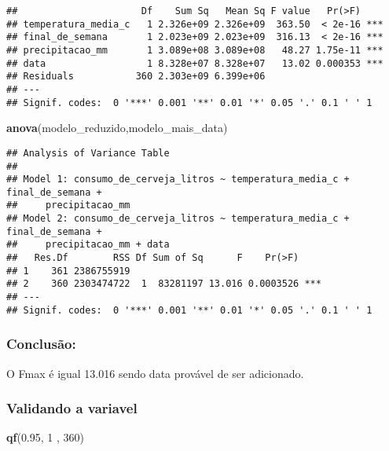 \documentclass[
]{article}
\newenvironment{Shaded}{\begin{snugshade}}{\end{snugshade}}
\newcommand{\DecValTok}[1]{\textcolor[rgb]{0.00,0.00,0.81}{#1}}
\newcommand{\FloatTok}[1]{\textcolor[rgb]{0.00,0.00,0.81}{#1}}
\newcommand{\FunctionTok}[1]{\textcolor[rgb]{0.13,0.29,0.53}{\textbf{#1}}}
\newcommand{\NormalTok}[1]{#1}
\begin{document}
\begin{verbatim}
##                      Df    Sum Sq   Mean Sq F value   Pr(>F)    
## temperatura_media_c   1 2.326e+09 2.326e+09  363.50  < 2e-16 ***
## final_de_semana       1 2.023e+09 2.023e+09  316.13  < 2e-16 ***
## precipitacao_mm       1 3.089e+08 3.089e+08   48.27 1.75e-11 ***
## data                  1 8.328e+07 8.328e+07   13.02 0.000353 ***
## Residuals           360 2.303e+09 6.399e+06                     
## ---
## Signif. codes:  0 '***' 0.001 '**' 0.01 '*' 0.05 '.' 0.1 ' ' 1
\end{verbatim}

\begin{Shaded}
\begin{Highlighting}[]
\FunctionTok{anova}\NormalTok{(modelo\_reduzido,modelo\_mais\_data)}
\end{Highlighting}
\end{Shaded}

\begin{verbatim}
## Analysis of Variance Table
## 
## Model 1: consumo_de_cerveja_litros ~ temperatura_media_c + final_de_semana + 
##     precipitacao_mm
## Model 2: consumo_de_cerveja_litros ~ temperatura_media_c + final_de_semana + 
##     precipitacao_mm + data
##   Res.Df        RSS Df Sum of Sq      F    Pr(>F)    
## 1    361 2386755919                                  
## 2    360 2303474722  1  83281197 13.016 0.0003526 ***
## ---
## Signif. codes:  0 '***' 0.001 '**' 0.01 '*' 0.05 '.' 0.1 ' ' 1
\end{verbatim}

\hypertarget{conclusuxe3o-7}{%
\subsubsection{Conclusão:}\label{conclusuxe3o-7}}

O Fmax é igual 13.016 sendo data provável de ser adicionado.

\hypertarget{validando-a-variavel-2}{%
\subsubsection{Validando a variavel}\label{validando-a-variavel-2}}

\begin{Shaded}
\begin{Highlighting}[]
\FunctionTok{qf}\NormalTok{(}\FloatTok{0.95}\NormalTok{, }\DecValTok{1}\NormalTok{ , }\DecValTok{360}\NormalTok{)}
\end{Highlighting}
\end{Shaded}
\end{document}
